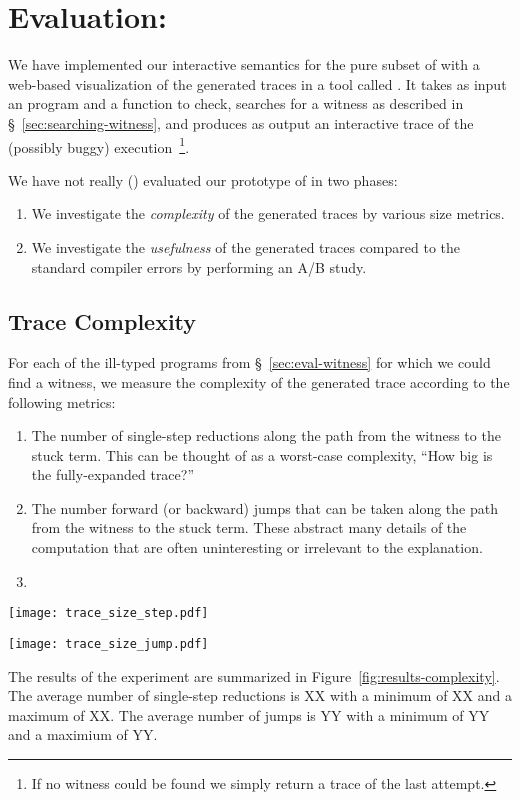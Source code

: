 \section{Evaluation: \nanomaly}
\label{sec:evaluation-nanomaly}
We have implemented our interactive semantics for the pure subset of
\ocaml with a web-based visualization of the generated traces in a tool
called \nanomaly.
%
It takes as input an \ocaml program and a function to check, searches
for a witness as described in \S~\ref{sec:searching-witness}, and
produces as output an interactive trace of the (possibly buggy)
execution~\footnote{If no witness could be found we simply return a trace
  of the last attempt.}.

We have not really () evaluated our prototype of \nanomaly in two phases:
%
\begin{enumerate}
\item We investigate the \emph{complexity} of the generated traces by various size metrics.
\item We investigate the \emph{usefulness} of the generated traces compared to the standard compiler errors by performing an A/B study.
\end{enumerate}

\subsection{Trace Complexity}
\label{sec:trace-complexity}
For each of the ill-typed programs from \S~\ref{sec:eval-witness} for
which we could find a witness, we measure the complexity of the
generated trace according to the following metrics:
%
\begin{enumerate}
\item The number of single-step reductions along the path from the
  witness to the stuck term. This can be thought of as a worst-case
  complexity, \ie ``How big is the fully-expanded trace?''
\item The number forward (or backward) jumps that can be taken along the
  path from the witness to the stuck term. These abstract many details
  of the computation that are often uninteresting or irrelevant to the
  explanation.
\item {}
\end{enumerate}
%
\begin{figure*}[t]
\centering
\begin{minipage}{0.49\linewidth}
\texttt{[image: trace\_size\_step.pdf]}
\end{minipage}
\begin{minipage}{0.49\linewidth}
\texttt{[image: trace\_size\_jump.pdf]}
\end{minipage}
\caption{Complexity of the generated traces.}
\label{fig:results-complexity}
\end{figure*}
%
The results of the experiment are summarized in
Figure~\ref{fig:results-complexity}.
%
The average number of single-step reductions is XX with a minimum of XX
and a maximum of XX. The average number of jumps is YY with a minimum of
YY and a maximium of YY.

